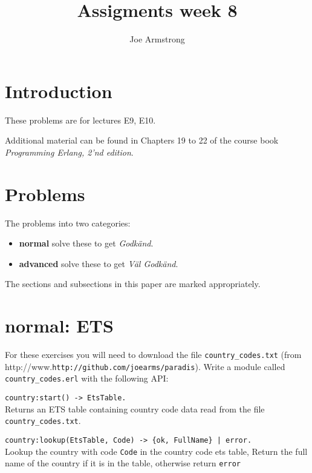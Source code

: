 \documentclass[12pt]{hitec}
\title{Assigments week 8}
\author{Joe Armstrong}
\begin{document}
\maketitle

\tableofcontents

\section{Introduction}
These problems are for lectures E9, E10.

Additional material can be found in Chapters 19 to 22 of the course book
{\sl Programming Erlang, 2'nd edition}.

\section{Problems}

The problems into two categories:

\begin{itemize}
\item {\bf normal} solve these to get {\sl Godk\"{a}nd}.
\item {\bf advanced} solve these to get {\sl V\"{a}l Godk\"{a}nd}.
\end{itemize}

The sections and subsections in this paper are marked appropriately.

\section{normal: ETS}

For these exercises you will need to download the file \verb+country_codes.txt+ (from
http://www.\verb+http://github.com/joearms/paradis+). Write a module called
\verb+country_codes.erl+ with the following API:

\begin{description}
\item \verb+country:start() -> EtsTable.+\\
Returns an ETS table containing country code data read from the file
\verb+country_codes.txt+.
\item \verb+country:lookup(EtsTable, Code) -> {ok, FullName} | error.+\\
Lookup the country with code \verb+Code+ in the country code ets table,
Return the full name of the country if it is in the table, otherwise return
\verb+error+
\end{description}
\end{document}
